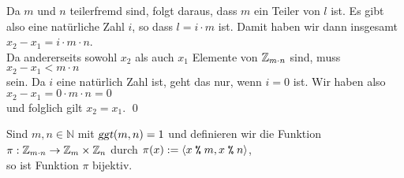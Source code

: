 \begin{enumerate}
      Da $m$ und $n$ teilerfremd sind, folgt daraus, dass $m$ ein Teiler von $l$ ist.  Es gibt also eine
      nat\"{u}rliche Zahl $i$, so dass $l = i \cdot m$ ist.  Damit haben wir dann insgesamt
      \\[0.2cm]
      \hspace*{1.3cm}
      $x_2 - x_1 = i \cdot m \cdot n$.
      \\[0.2cm]
      Da andererseits sowohl $x_2$ als auch $x_1$ Elemente von $\mathbb{Z}_{m \cdot n}$ sind, muss
      \\[0.2cm]
      \hspace*{1.3cm}
      $x_2 - x_1 < m \cdot n$
      \\[0.2cm]
      sein.  Da $i$ eine nat\"{u}rlich Zahl ist, geht das nur, wenn $i = 0$ ist.  Wir haben also
      \\[0.2cm]
      \hspace*{1.3cm}
      $x_2 - x_1 = 0 \cdot m \cdot n = 0$
      \\[0.2cm]
      und folglich gilt $x_2 = x_1$. \qed
\end{enumerate}


\begin{Korollar} \label{satz:china2} \lb
Sind $m,n \in \mathbb{N}$ mit $\textsl{ggt}(m,n) =1$ und definieren
 wir die Funktion 
\\[0.2cm]
\hspace*{1.3cm}
$\pi : \mathbb{Z}_{m \cdot n} \rightarrow \mathbb{Z}_{m} \times \mathbb{Z}_{n}$ \quad durch \quad
$\pi(x) := \langle x \;\texttt{\%}\; m, x \;\texttt{\%}\; n \rangle$,
\\[0.2cm]
so ist Funktion $\pi$ bijektiv.  
\end{Korollar}


